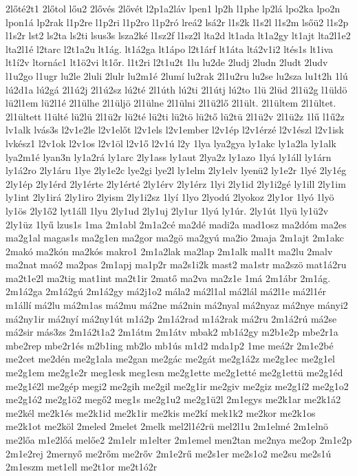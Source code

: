 {2lőté2t1
2lőtol
lőu2
2lővés
2lővét
l2p1a2láv
lpen1
lp2h
l1phe
lp2lá
lpo2ka
lpo2n
lpon1á
lp2rak
l1p2re
l1p2ri
l1p2ro
l1p2ró
lreá2
lsá2r
l1s2k
l1s2l
l1s2m
lsőü2
l1s2p
l1s2r
lst2
ls2ta
ls2ti
lsus3s
lsza2ké
l1sz2f
l1sz2l
lta2d
lt1ada
lt1a2gy
lt1ajt
lta2l1e2
lta2l1é
l2tarc
l2t1a2u
lt1ág.
lt1á2ga
lt1ápo
l2t1árf
lt1áta
ltá2v1i2
ltés1s
lt1iva
lt1í2v
ltornác1
lt1ö2vi
lt1őr.
l1t2ri
l2t1u2t
1lu
lu2de
2ludj
2ludn
2ludt
2ludv
l1u2go
l1ugr
lu2le
2luli
2lulr
lu2m1é
2lumí
lu2rak
2l1u2ru
lu2se
lu2sza
lu1t2h
1lú
lú2d1a
lú2gá
2l1ú2j
2l1ú2sz
lú2té
2l1úth
lú2ti
2l1útj
lú2to
1lü
2lüd
2l1ü2g
l1üldö
lü2l1em
lü2l1é
2l1ülhe
2l1üljö
2l1ülne
2l1ülni
2l1ü2lő
2l1ült.
2l1ültem
2l1ültet.
2l1ültett
l1ülté
lü2lü
2l1ü2r
lü2té
lü2ti
lü2tö
lü2tő
lü2tü
2l1ü2v
2l1ü2z
1lű
l1ű2z
lv1alk
lvás3s
l2v1e2le
l2v1előt
l2v1els
l2v1ember
l2v1ép
l2v1érzé
l2v1észl
l2v1isk
lvkész1
l2v1ok
l2v1os
l2v1öl
l2v1ő
l2v1ú
l2y
1lya
lya2gya
ly1akc
ly1a2la
ly1alk
lya2m1é
lyan3n
ly1a2rá
ly1arc
2ly1ass
ly1aut
2lya2z
ly1azo
1lyá
ly1áll
ly1árn
ly1á2ro
2ly1áru
1lye
2ly1e2c
lye2gi
lye2l
ly1elm
2ly1elv
lyenü2
ly1e2r
1lyé
2ly1ég
2ly1ép
2ly1érd
2ly1érte
2ly1érté
2ly1érv
2ly1érz
1lyi
2ly1id
2ly1i2gé
ly1ill
2ly1im
ly1int
2ly1irá
2ly1iro
2lyism
2ly1i2sz
1lyí
1lyo
2lyodú
2lyokoz
2ly1or
1lyó
1lyö
ly1ös
2ly1ő2
lyt1áll
1lyu
2ly1ud
2ly1uj
2ly1ur
1lyú
ly1úr.
2ly1út
1lyü
ly1ü2v
2ly1üz
1lyű
lzus1s
1ma
2m1abl
2m1a2cé
ma2dé
madi2a
mad1osz
ma2dóm
ma2es
ma2g1al
magas1s
ma2g1en
ma2gor
ma2gö
ma2gyú
ma2io
2maja
2m1ajt
2m1akc
2makó
ma2kón
ma2kós
makro1
2m1a2lak
ma2lap
2m1alk
mal1t
ma2lu
2malv
ma2nat
maó2
ma2pas
2m1apj
ma1p2r
ma2s1i2k
mast2
ma1str
ma2szö
mat1á2ru
ma2t1e2l
ma2tig
mat1int
ma2t1ir
2matő
ma2va
ma2z1e
1má
2m1ábr
2m1ág.
2m1á2ga
2m1á2gú
2m1á2gy
má2j1o2
mála2
má2l1al
má2lál
má2l1e
má2l1ér
m1állí
má2lu
má2m1as
má2mu
má2ne
má2nin
má2nyal
má2nyaz
má2nye
mányi2
má2ny1ir
má2nyí
má2ny1út
m1á2p
2m1á2rad
m1á2rak
má2ru
2m1á2rú
má2se
má2sir
más3zs
2m1á2t1a2
2m1átm
2m1átv
mbak2
mb1á2gy
m2b1e2p
mbe2r1a
mbe2rep
mbe2r1és
m2b1ing
mb2lo
mb1ús
m1d2
mda1p2
1me
meá2r
2m1e2bé
me2cet
me2dén
me2g1ala
me2gan
me2gác
me2gát
me2g1á2z
me2g1ec
me2g1el
me2g1em
me2g1e2r
meg1esk
meg1esn
me2g1ette
me2g1etté
me2g1ettü
me2g1éd
me2g1é2l
me2gép
megi2
me2gih
me2gil
me2g1ir
me2giv
me2giz
me2g1í2
me2g1o2
me2g1ó2
me2g1ö2
megő2
meg1s
me2g1u2
me2g1ü2l
2m1egys
me2k1ar
me2k1á2
me2kél
me2k1és
me2k1id
me2k1ir
me2kis
me2kí
mek1k2
me2kor
me2k1os
me2k1ot
me2köl
2meled
2melet
2melk
mel2l1é2rü
mel2l1u
2m1elmé
2m1elnö
me2lőa
m1e2lőá
melőe2
2m1elr
m1elter
2m1emel
men2tan
me2nya
me2op
2m1e2p
2m1e2rej
2mernyő
me2rőm
me2rőv
2m1e2rű
me2s1er
me2s1o2
me2su
me2s1ú
2m1eszm
met1ell
me2t1or
me2t1ó2r
}
